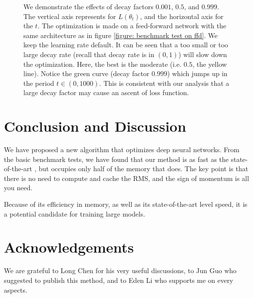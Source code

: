 \documentclass[superscriptaddress,twocolumn,aps,prd,10pt,nofootinbib,preprintnumbers]{revtex4-2}
\newcommand{\tmverbatim}[1]{\text{{\ttfamily{#1}}}}
\begin{document}
\begin{figure}[h]
  \caption{\label{figure: decay factor}We demonstrate the effects of decay
  factors $0.001$, $0.5$, and $0.999$. The vertical axis represents for $L
  (\theta_t)$, and the horizontal axis for the $t$. The optimization is made
  on a feed-forward network with the same architecture as in figure
  \ref{figure: benchmark test on ffd}. We keep the learning rate default. It
  can be seen that a too small or too large decay rate (recall that decay rate
  is in $(0, 1)$) will slow down the optimization. Here, the best is the
  moderate (i.e. $0.5$, the yellow line). Notice the green curve (decay factor
  $0.999$) which jumps up in the period $t \in (0, 1000)$. This is consistent
  with our analysis that a large decay factor may cause an ascent of loss
  function.}
\end{figure}

\section{Conclusion and Discussion}

We have proposed a new algorithm that optimizes deep neural networks. From the
basic benchmark tests, we have found that our method is as fast as the
state-of-the-art \tmverbatim{adam}, but occupies only half of the memory that
\tmverbatim{adam} does. The key point is that there is no need to compute and
cache the RMS, and the sign of momentum is all you need.

Because of its efficiency in memory, as well as its state-of-the-art level
speed, it is a potential candidate for training large models.

\section{Acknowledgements}

We are grateful to Long Chen for his very useful discussions, to Jun Guo who
suggested to publish this method, and to Eden Li who supports me on every
aspects.



\end{document}
